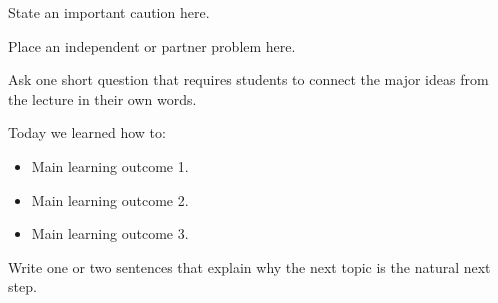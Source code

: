 \documentclass[12pt]{article}
\begin{document}
\begin{warningbox}
State an important caution here.
\end{warningbox}

\begin{examplebox}
Place an independent or partner problem here.

\vspace{1.2in}
\end{examplebox}

\begin{thinkbox}[Reflection]
Ask one short question that requires students to connect the major ideas from the lecture in their own words.

\vspace{0.4in}
\end{thinkbox}

\begin{summarybox}
Today we learned how to:
\begin{itemize}
  \item Main learning outcome 1.
  \item Main learning outcome 2.
  \item Main learning outcome 3.
\end{itemize}
\end{summarybox}

\begin{nexttimebox}
Write one or two sentences that explain why the next topic is the natural next step.
\end{nexttimebox}
\end{document}
